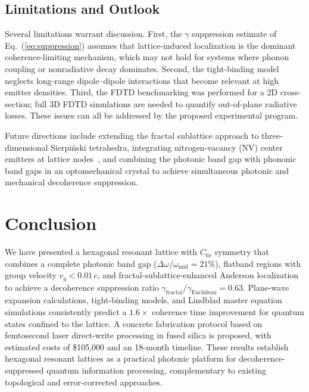 \documentclass[10pt,letterpaper]{article}
\begin{document}
\subsection{Limitations and Outlook}

Several limitations warrant discussion. First, the $\gamma$ suppression estimate of Eq.~(\ref{eq:suppression}) assumes that lattice-induced localization is the dominant coherence-limiting mechanism, which may not hold for systems where phonon coupling or nonradiative decay dominates. Second, the tight-binding model neglects long-range dipole--dipole interactions that become relevant at high emitter densities. Third, the FDTD benchmarking was performed for a 2D cross-section; full 3D FDTD simulations are needed to quantify out-of-plane radiative losses. These issues can all be addressed by the proposed experimental program.

Future directions include extending the fractal sublattice approach to three-dimensional Sierpi\'{n}ski tetrahedra, integrating nitrogen-vacancy (NV) center emitters at lattice nodes~\cite{Aharonovich2016,Childress2006}, and combining the photonic band gap with phononic band gaps in an optomechanical crystal to achieve simultaneous photonic and mechanical decoherence suppression.


\section{Conclusion}
\label{sec:conclusion}

We have presented a hexagonal resonant lattice with $C_{6v}$ symmetry that combines a complete photonic band gap ($\Delta\omega/\omega_\mathrm{mid} = 21\%$), flatband regions with group velocity $v_g < 0.01\,c$, and fractal-sublattice-enhanced Anderson localization to achieve a decoherence suppression ratio $\gamma_\mathrm{fractal}/\gamma_\mathrm{Euclidean} = 0.63$. Plane-wave expansion calculations, tight-binding models, and Lindblad master equation simulations consistently predict a $1.6\times$ coherence time improvement for quantum states confined to the lattice. A concrete fabrication protocol based on femtosecond laser direct-write processing in fused silica is proposed, with estimated costs of \$105,000 and an 18-month timeline. These results establish hexagonal resonant lattices as a practical photonic platform for decoherence-suppressed quantum information processing, complementary to existing topological and error-corrected approaches.
\end{document}
